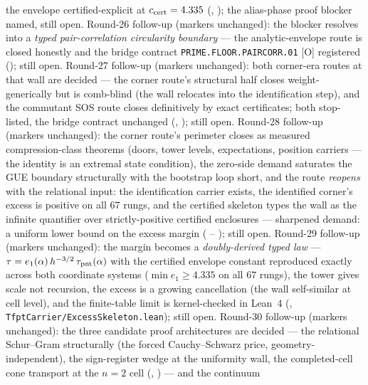 the envelope certified-explicit at $c_{\rm cert} = 4.335$
(,
); the alias-phase proof
blocker named, still open.  Round-26 follow-up (markers
unchanged): the blocker resolves into a \emph{typed
pair-correlation circularity boundary} --- the analytic-envelope
route is closed honestly and the bridge contract
\texttt{PRIME.FLOOR.PAIRCORR.01} [O] registered
(); still open.
Round-27 follow-up (markers unchanged): both corner-era routes at
that wall are decided --- the corner route's structural half
closes weight-generically but is comb-blind (the wall relocates
into the identification step), and the commutant SOS route closes
definitively by exact certificates; both stop-listed, the bridge
contract unchanged
(,
); still open.
Round-28 follow-up (markers unchanged): the corner route's
perimeter closes as measured compression-class theorems (doors,
tower levels, expectations, position carriers --- the identity is
an extremal state condition), the zero-side demand saturates the
GUE boundary structurally with the bootstrap loop short, and the
route \emph{reopens} with the relational input: the
identification carrier exists, the identified corner's excess is
positive on all $67$ rungs, and the certified skeleton types the
wall as the infinite quantifier over strictly-positive certified
enclosures --- sharpened demand: a uniform lower bound on the
excess margin
( --
); still open.
Round-29 follow-up (markers unchanged): the margin becomes a
\emph{doubly-derived typed law} ---
$\tau = e_1(\alpha)\, h^{-3/2}\, \tau_{\rm pnt}(\alpha)$ with the
certified envelope constant reproduced exactly across both
coordinate systems ($\min e_1 \ge 4.335$ on all $67$ rungs), the
tower gives scale not recursion, the excess is a growing
cancellation (the wall self-similar at cell level), and the
finite-table limit is kernel-checked in Lean~4
(,
\texttt{TfptCarrier/ExcessSkeleton.lean}); still open.
Round-30 follow-up (markers unchanged): the three candidate
proof architectures are decided --- the relational Schur--Gram
structurally (the forced Cauchy--Schwarz price,
geometry-independent), the sign-register wedge at the uniformity
wall, the completed-cell cone transport at the $n = 2$ cell
(,
) --- and the continuum
